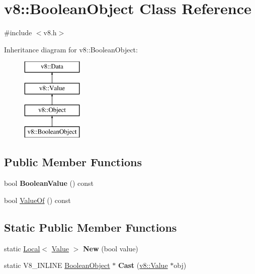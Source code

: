 \hypertarget{classv8_1_1_boolean_object}{}\section{v8\+:\+:Boolean\+Object Class Reference}
\label{classv8_1_1_boolean_object}


{\ttfamily \#include $<$v8.\+h$>$}

Inheritance diagram for v8\+:\+:Boolean\+Object\+:\begin{figure}[H]
\begin{center}
\leavevmode
\includegraphics[height=4.000000cm]{classv8_1_1_boolean_object}
\end{center}
\end{figure}
\subsection*{Public Member Functions}
\begin{DoxyCompactItemize}
\item 
\hypertarget{classv8_1_1_boolean_object_a646051d57e93ba1df2ce6c93eef5aec9}{}bool {\bfseries Boolean\+Value} () const \label{classv8_1_1_boolean_object_a646051d57e93ba1df2ce6c93eef5aec9}

\item 
bool \hyperlink{classv8_1_1_boolean_object_a283419656e641bcd9588dee56c0a0686}{Value\+Of} () const 
\end{DoxyCompactItemize}
\subsection*{Static Public Member Functions}
\begin{DoxyCompactItemize}
\item 
\hypertarget{classv8_1_1_boolean_object_af57ca9198a6c6d00617da80b3f705e37}{}static \hyperlink{classv8_1_1_local}{Local}$<$ \hyperlink{classv8_1_1_value}{Value} $>$ {\bfseries New} (bool value)\label{classv8_1_1_boolean_object_af57ca9198a6c6d00617da80b3f705e37}

\item 
\hypertarget{classv8_1_1_boolean_object_ac701398c9b1c74fbce31d66106c9a87f}{}static V8\+\_\+\+I\+N\+L\+I\+N\+E \hyperlink{classv8_1_1_boolean_object}{Boolean\+Object} $\ast$ {\bfseries Cast} (\hyperlink{classv8_1_1_value}{v8\+::\+Value} $\ast$obj)\label{classv8_1_1_boolean_object_ac701398c9b1c74fbce31d66106c9a87f}

\end{DoxyCompactItemize}


